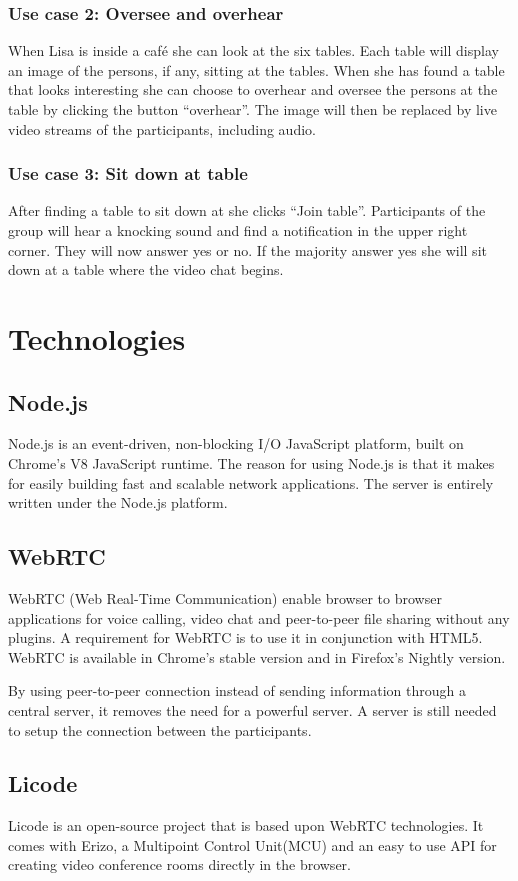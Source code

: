\documentclass[12pt, titlepage]{article}
\begin{document}
\subsubsection{Use case 2: Oversee and overhear}
When Lisa is inside a café she can look at the six tables. Each table will display an image of the persons, if any, sitting at the tables. When she has found a table that looks interesting she can choose to overhear and oversee the persons at the table by clicking the button “overhear”. The image will then be replaced by live video streams of the participants, including audio.
\subsubsection{Use case 3: Sit down at table}
After finding a table to sit down at she clicks “Join table”. Participants of the group will hear a knocking sound and find a notification in the upper right corner. They will now answer yes or no. If the majority answer yes she will sit down at a table where the video chat begins.
\section{Technologies}
\subsection{Node.js}
Node.js is an event-driven, non-blocking I/O JavaScript platform, built on Chrome’s V8 JavaScript runtime. The reason for using Node.js is that it makes for easily building fast and scalable network applications. The server is entirely written under the Node.js platform.
\subsection{WebRTC}
WebRTC (Web Real-Time Communication) enable browser to browser applications for voice calling, video chat and peer-to-peer file sharing without any plugins. A requirement for WebRTC is to use it in conjunction with HTML5. WebRTC is available in Chrome's stable version and in Firefox's Nightly version.

By using peer-to-peer connection instead of sending information through a central server, it removes the need for a powerful server. A server is still needed to setup the connection between the participants.
\subsection{Licode}
Licode is an open-source project that is based upon WebRTC technologies. It comes with Erizo, a Multipoint Control Unit(MCU) and an easy to use API for creating video conference rooms directly in the browser. 
\end{document}
